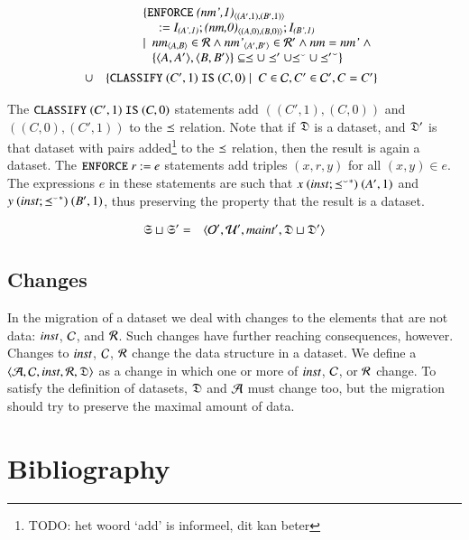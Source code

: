 \documentclass{elsarticle}
\begin{document}
\begin{definition}
   \begin{eqnarray}
      &&\begin{array}[t]{@{}l}
         \{ {\tt ENFORCE\ }\declare{(nm',1)}{(A',1)}{(B',1)}\\\quad{\tt\ :=\ }\ident{(A',1)};\declare{(nm,0)}{(A,0)}{(B,0)};\ident{(B',1)}\\
            \mid\ \begin{array}[t]{@{}l}
               \declare{nm}{A}{B}\in\rels\wedge\declare{nm'}{A'}{B'}\in\rels'\wedge\id{nm}=\id{nm'}\ \wedge\\
               \{\pair{A}{A'},\pair{B}{B'}\}\subseteq\isa\cup\isa'\cup\flip{\isa}\cup\flip{\isa'}\}
               \end{array}
           \end{array}\\
           &\cup&\begin{array}[t]{@{}l}
            \{ {\tt CLASSIFY\ }(C',1){\tt\ IS\ }(C,0)\mid\ C\in\concepts,C'\in\concepts',C=C'\}\\
           \end{array}
   \end{eqnarray}
\end{definition}

The ${\tt CLASSIFY\ }(C',1){\tt\ IS\ }(C,0)$ statements add $((C',1),(C,0))$ and  $((C,0),(C',1))$ to the $\preceq$ relation. Note that if $\mathfrak{D}$ is a dataset, and $\mathfrak{D}'$ is that dataset with pairs added\footnote{TODO: het woord `add' is informeel, dit kan beter} to the $\preceq$ relation, then the result is again a dataset.
The ${\tt ENFORCE\ }r{\tt\ :=\ }e$ statements add triples $(x,r,y)$ for all $(x,y)\in e$.
The expressions $e$ in these statements are such that $x\ (\text{\it inst\/} ; {{\preceq}^\smallsmile}^*)\ (A',1)$ and $y \ (\inst \compose \kleenestar{\flip{\isa}})\ (B',1)$, thus preserving the property that the result is a dataset.

\begin{definition}[]
   \begin{eqnarray}
      \mathfrak{S}\sqcup\mathfrak{S}'&=&\langle\mathcal{O}',\mathcal{U}',\text{\it maint\/}',\mathfrak{D}\sqcup\mathfrak{D}'\rangle
   \end{eqnarray}
\end{definition}

\subsection{Changes}
   In the migration of a dataset we deal with changes to the elements that are not data:
   $\text{\it inst\/}$, $\mathcal{C}$, and $\mathcal{R}$.
   Such changes have further reaching consequences, however.
   Changes to $\text{\it inst\/}$, $\mathcal{C}$, $\mathcal{R}$ change the data structure in a dataset.
   We define a  $\langle\mathcal{A},\mathcal{C},\text{\it inst\/},\mathcal{R},\mathfrak{D}\rangle$ as a change in which one or more of $\text{\it inst\/}$, $\mathcal{C}$, or $\mathcal{R}$ change.
   To satisfy the definition of datasets, $\mathfrak{D}$ and $\mathcal{A}$ must change too,
   but the migration should try to preserve the maximal amount of data.

\section{Bibliography}


\end{document}
